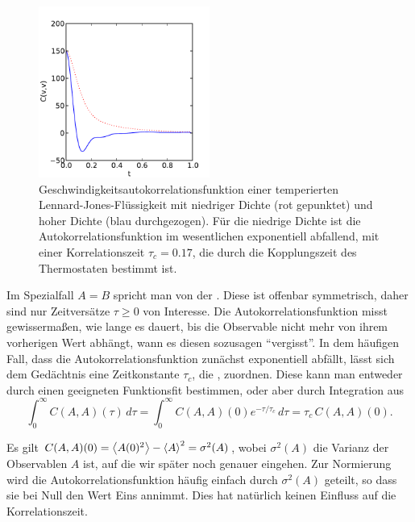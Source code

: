 \begin{figure}
  \centering
  \includegraphics[width=0.5\textwidth]{plots/v_ac}
  \caption{Geschwindigkeitsautokorrelationsfunktion einer temperierten
    Lennard-Jones-Flüs\-sig\-ke\-it mit niedriger Dichte (rot
    gepunktet) und hoher Dichte (blau durchgezogen). Für die niedrige
    Dichte ist die Autokorrelationsfunktion im wesentlichen
    exponentiell abfallend, mit einer Korrelationszeit $\tau_c=0.17$,
    die durch die Kopplungszeit des Thermostaten bestimmt ist.}
  \label{fig:vac}
\end{figure}

Im Spezialfall $A=B$ spricht man von der
\emph{}. Diese ist offenbar
symmetrisch, daher sind nur Zeitversätze $\tau\ge 0$ von
Interesse. Die Autokorrelationsfunktion misst gewissermaßen, wie lange
es dauert, bis die Observable nicht mehr von ihrem vorherigen Wert
abhängt, wann es diesen sozusagen "`vergisst"'. In dem häufigen Fall,
dass die Autokorrelationsfunktion zunächst exponentiell abfällt, lässt
sich dem Gedächtnis eine Zeitkonstante $\tau_c$, die
\emph{}, zuordnen. Diese kann man entweder
durch einen geeigneten Funktionsfit bestimmen, oder aber durch
Integration aus
\begin{equation}
  \label{eq:tauc}
  \int_{0}^{\infty} C(A,A)(\tau)\,d\tau = \int_{0}^{\infty}
  C(A,A)(0)e^{-\tau/\tau_c}\,d\tau = \tau_c\,C(A,A)(0).
\end{equation}

Es gilt $C(A,A)(0) = \left\langle{A(0)^2}\right\rangle - \left\langle{A}\right\rangle^2 = \sigma^2(A)$, wobei
$\sigma^2(A)$ die Varianz der Observablen $A$ ist, auf die wir später noch
genauer eingehen. Zur Normierung wird die Autokorrelationsfunktion häufig
einfach durch $\sigma^2(A)$ geteilt, so dass sie bei Null den Wert Eins
annimmt. Dies hat natürlich keinen Einfluss auf die Korrelationszeit.

